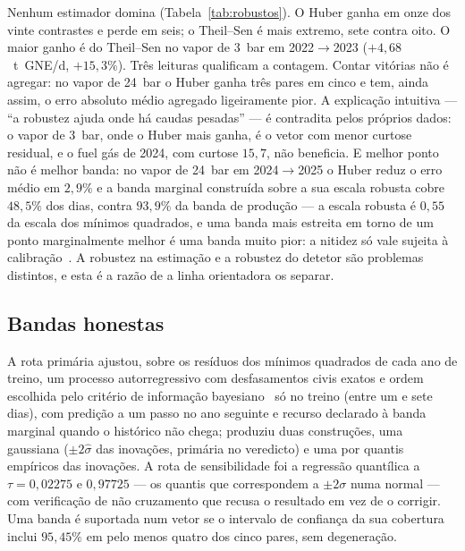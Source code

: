 Nenhum estimador domina (Tabela~\ref{tab:robustos}). O Huber ganha em onze
dos vinte contrastes e perde em seis; o Theil--Sen é mais extremo, sete
contra oito. O maior ganho é do Theil--Sen no vapor de 3~bar em
2022${\to}$2023 ($+4{,}68$~t~GNE/d, $+15{,}3\%$). Três leituras
qualificam a contagem. Contar vitórias não é agregar: no vapor de 24~bar o
Huber ganha três pares em cinco e tem, ainda assim, o erro absoluto médio
agregado ligeiramente pior. A explicação intuitiva --- ``a robustez ajuda
onde há caudas pesadas'' --- é contradita pelos próprios dados: o vapor de
3~bar, onde o Huber mais ganha, é o vetor com menor curtose residual, e o
fuel gás de 2024, com curtose $15{,}7$, não beneficia. E melhor ponto não é
melhor banda: no vapor de 24~bar em 2024${\to}$2025 o Huber reduz o erro
médio em $2{,}9\%$ e a banda marginal construída sobre a sua escala robusta
cobre $48{,}5\%$ dos dias, contra $93{,}9\%$ da banda de produção --- a
escala robusta é $0{,}55$ da escala dos mínimos quadrados, e uma banda mais
estreita em torno de um ponto marginalmente melhor é uma banda muito pior:
a nitidez só vale sujeita à calibração~\cite{Gneiting2007}.
A robustez na estimação e a robustez do detetor são problemas distintos, e
esta é a razão de a linha orientadora os separar.

\subsection{Bandas honestas}
\label{sec:demo-bandas}

A rota primária ajustou, sobre os resíduos dos mínimos quadrados de cada ano
de treino, um processo autorregressivo com desfasamentos civis exatos e
ordem escolhida pelo critério de informação bayesiano~\cite{Schwarz1978} só
no treino (entre um e sete dias), com predição a um passo no ano seguinte e recurso declarado à banda
marginal quando o histórico não chega; produziu duas construções, uma
gaussiana ($\pm 2\hat\sigma$ das inovações, primária no veredicto) e uma por
quantis empíricos das inovações. A rota de sensibilidade foi a regressão
quantílica a $\tau = 0{,}02275$ e $0{,}97725$ --- os quantis que
correspondem a $\pm 2\sigma$ numa normal --- com verificação de não
cruzamento que recusa o resultado em vez de o corrigir. Uma banda é
suportada num vetor se o intervalo de confiança da sua cobertura inclui
$95{,}45\%$ em pelo menos quatro dos cinco pares, sem degeneração.

